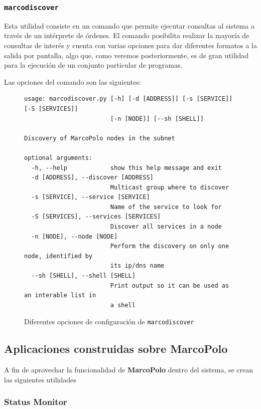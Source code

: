 \subsubsection{\texttt{marcodiscover}}

Esta utilidad consiste en un comando que permite ejecutar consultas al sistema a través de un intérprete de órdenes. El comando posibilita realizar la mayoría de consultas de interés y cuenta con varias opciones para dar diferentes formatos a la salida por pantalla, algo que, como veremos posteriormente, es de gran utilidad para la ejecución de un conjunto particular de programas.

Las opciones del comando son las siguientes:

\begin{figure}[H]
\centering
\begin{lstlisting}
usage: marcodiscover.py [-h] [-d [ADDRESS]] [-s [SERVICE]] [-S [SERVICES]]
                        [-n [NODE]] [--sh [SHELL]]

Discovery of MarcoPolo nodes in the subnet

optional arguments:
  -h, --help            show this help message and exit
  -d [ADDRESS], --discover [ADDRESS]
                        Multicast group where to discover
  -s [SERVICE], --service [SERVICE]
                        Name of the service to look for
  -S [SERVICES], --services [SERVICES]
                        Discover all services in a node
  -n [NODE], --node [NODE]
                        Perform the discovery on only one node, identified by
                        its ip/dns name
  --sh [SHELL], --shell [SHELL]
                        Print output so it can be used as an interable list in
                        a shell

\end{lstlisting}
\caption{Diferentes opciones de configuración de \texttt{marcodiscover}}
\label{fig:marcodiscover_help}
\end{figure}

\subsection{Aplicaciones construidas sobre MarcoPolo}

A fin de aprovechar la funcionalidad de \textbf{MarcoPolo} dentro del sistema, se crean las siguientes utilidades

\subsubsection{Status Monitor}


